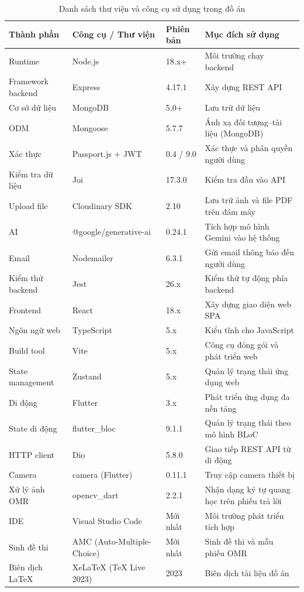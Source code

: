 ﻿\documentclass[../DoAn.tex]{subfiles}
\begin{document}
\begin{table}[H]
\scriptsize
\centering
\begin{tabular}{|p{2.3cm}|p{4.2cm}|p{1.8cm}|p{6.5cm}|}
\hline
\textbf{Thành phần} & \textbf{Công cụ / Thư viện} & \textbf{Phiên bản} & \textbf{Mục đích sử dụng} \\ \hline
Runtime & Node.js & 18.x+ & Môi trường chạy backend \\ \hline
Framework backend & Express & 4.17.1 & Xây dựng REST API \\ \hline
Cơ sở dữ liệu & MongoDB & 5.0+ & Lưu trữ dữ liệu \\ \hline
ODM & Mongoose & 5.7.7 & Ánh xạ đối tượng--tài liệu (MongoDB) \\ \hline
Xác thực & Passport.js + JWT & 0.4 / 9.0 & Xác thực và phân quyền người dùng \\ \hline
Kiểm tra dữ liệu & Joi & 17.3.0 & Kiểm tra đầu vào API \\ \hline
Upload file & Cloudinary SDK & 2.10 & Lưu trữ ảnh và file PDF trên đám mây \\ \hline
AI & @google/generative-ai & 0.24.1 & Tích hợp mô hình Gemini vào hệ thống \\ \hline
Email & Nodemailer & 6.3.1 & Gửi email thông báo đến người dùng \\ \hline
Kiểm thử backend & Jest & 26.x & Kiểm thử tự động phía backend \\ \hline
Frontend & React & 18.x & Xây dựng giao diện web SPA \\ \hline
Ngôn ngữ web & TypeScript & 5.x & Kiểu tĩnh cho JavaScript \\ \hline
Build tool & Vite & 5.x & Công cụ đóng gói và phát triển web \\ \hline
State management & Zustand & 5.x & Quản lý trạng thái ứng dụng web \\ \hline
Di động & Flutter & 3.x & Phát triển ứng dụng đa nền tảng \\ \hline
State di động & flutter\_bloc & 9.1.1 & Quản lý trạng thái theo mô hình BLoC \\ \hline
HTTP client & Dio & 5.8.0 & Giao tiếp REST API từ di động \\ \hline
Camera & camera (Flutter) & 0.11.1 & Truy cập camera thiết bị \\ \hline
Xử lý ảnh OMR & opencv\_dart & 2.2.1 & Nhận dạng ký tự quang học trên phiếu trả lời \\ \hline
IDE & Visual Studio Code & Mới nhất & Môi trường phát triển tích hợp \\ \hline
Sinh đề thi & AMC (Auto-Multiple-Choice) & Mới nhất & Sinh đề thi và mẫu phiếu OMR \\ \hline
Biên dịch LaTeX & XeLaTeX (TeX Live 2023) & 2023 & Biên dịch tài liệu đồ án \\ \hline
\end{tabular}
\caption{Danh sách thư viện và công cụ sử dụng trong đồ án}
\label{table:4.1}
\end{table}
\end{document}
